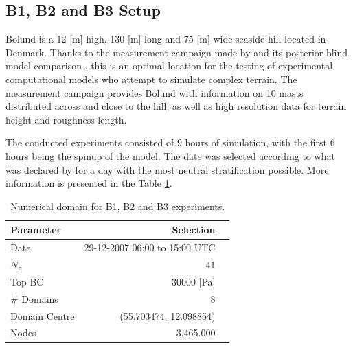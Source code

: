 \subsection{B1, B2 and B3 Setup}
Bolund is a 12 [m] high, 130 [m] long and 75 [m] wide seaside hill located in Denmark. Thanks to the measurement campaign made by \cite{Bechmann2009}  and its posterior blind model comparison \citep{Berg2011,Bechmann2011}, this is an optimal location for the testing of experimental computational models who attempt to simulate complex terrain. The measurement campaign provides Bolund with information on 10 masts distributed across and close to the hill, as well as high resolution data for terrain height and roughness length.


The conducted experiments consisted of 9 hours of simulation, with the first 6 hours being the spinup of the model. The date was selected according to what was declared by  \cite{Bechmann2009} for a day with the most neutral stratification possible. More information is presented in the Table \ref{tab:05_config_bol}.

\begin{table}[h!]
	\caption{Numerical domain for B1, B2 and B3 experiments.}\label{tab:05_config_bol}
	\centering
	\begin{tabular}{lrr}
		\toprule
		Parameter & Selection \\
		\midrule
		Date	 	 & 29-12-2007 06:00 to 15:00 UTC \\
		$N_z$	 	 & 41   \\
		Top BC	& 30000 [Pa]\\
		\# Domains	& 8   \\
		Domain Centre	& (55.703474, 12.098854)   \\
		Nodes & 3.465.000\\
		\bottomrule
	\end{tabular}
\end{table}

